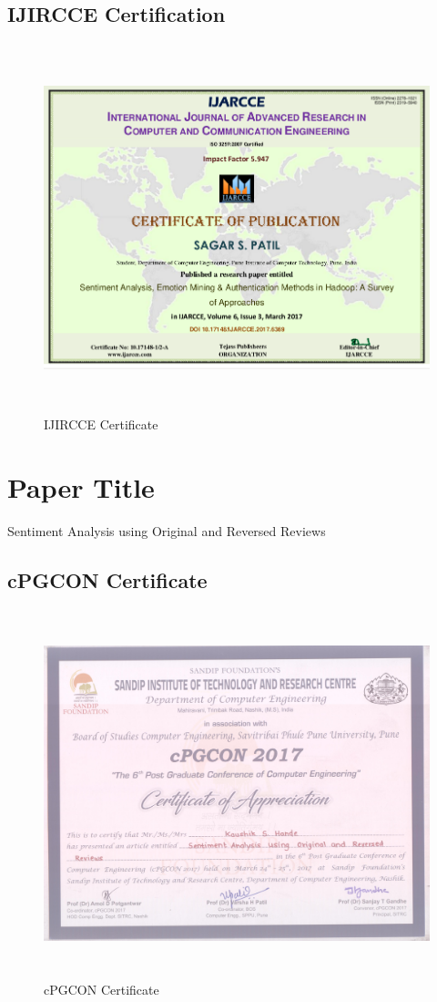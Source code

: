\documentclass[oneside,a4paper,12pt]{pictreport}
\begin{document}
\subsection{IJIRCCE Certification}
\begin{figure}[!h]
\includegraphics[width=5.5in,height=4.2in]{ijarcce.png}
\caption{IJIRCCE Certificate}
\end{figure}
\section{Paper Title}
Sentiment Analysis using Original and Reversed Reviews
\newpage
\subsection{cPGCON Certificate}

\begin{figure}[!h]
\includegraphics[width=5.5in,height=4.2in]{6107_certificate.jpg}
\caption{cPGCON Certificate}
\end{figure}
\end{document}
